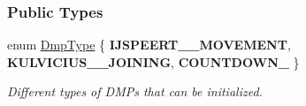 \subsubsection*{Public Types}
\begin{DoxyCompactItemize}
\item 
enum \hyperlink{group__Dmps_gaccba8d09ec99ae66e469b3511bb232a4}{Dmp\+Type} \{ {\bfseries I\+J\+S\+P\+E\+E\+R\+T\+\_\+\_\+\+M\+O\+V\+E\+M\+E\+N\+T}, 
{\bfseries K\+U\+L\+V\+I\+C\+I\+U\+S\+\_\+\_\+\+J\+O\+I\+N\+I\+N\+G}, 
{\bfseries C\+O\+U\+N\+T\+D\+O\+W\+N\+\_}
 \}
\begin{DoxyCompactList}\small\item\em Different types of D\+M\+Ps that can be initialized. \end{DoxyCompactList}\end{DoxyCompactItemize}
